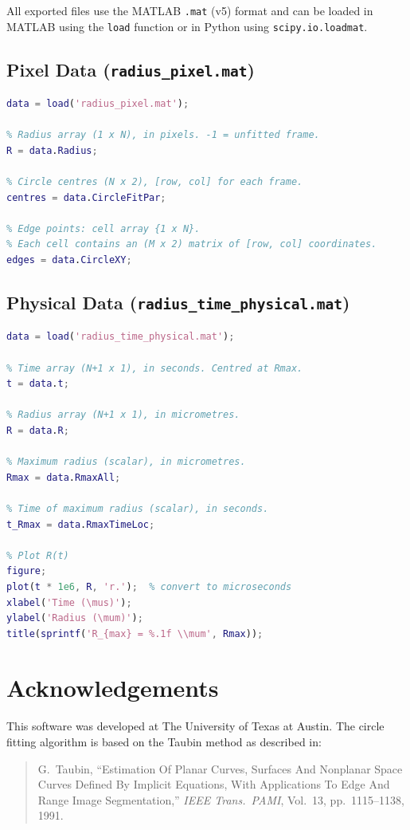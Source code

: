 \documentclass[11pt, letterpaper]{article}
\begin{document}
All exported files use the MATLAB \texttt{.mat} (v5) format and can be loaded
in MATLAB using the \texttt{load} function or in Python using
\texttt{scipy.io.loadmat}.

\subsection{Pixel Data (\texttt{radius\_pixel.mat})}

\begin{lstlisting}[language=Matlab]
data = load('radius_pixel.mat');

% Radius array (1 x N), in pixels. -1 = unfitted frame.
R = data.Radius;

% Circle centres (N x 2), [row, col] for each frame.
centres = data.CircleFitPar;

% Edge points: cell array {1 x N}.
% Each cell contains an (M x 2) matrix of [row, col] coordinates.
edges = data.CircleXY;
\end{lstlisting}

\subsection{Physical Data (\texttt{radius\_time\_physical.mat})}

\begin{lstlisting}[language=Matlab]
data = load('radius_time_physical.mat');

% Time array (N+1 x 1), in seconds. Centred at Rmax.
t = data.t;

% Radius array (N+1 x 1), in micrometres.
R = data.R;

% Maximum radius (scalar), in micrometres.
Rmax = data.RmaxAll;

% Time of maximum radius (scalar), in seconds.
t_Rmax = data.RmaxTimeLoc;

% Plot R(t)
figure;
plot(t * 1e6, R, 'r.');  % convert to microseconds
xlabel('Time (\mus)');
ylabel('Radius (\mum)');
title(sprintf('R_{max} = %.1f \\mum', Rmax));
\end{lstlisting}


\section*{Acknowledgements}

This software was developed at The University of Texas at Austin. The circle
fitting algorithm is based on the Taubin method as described in:

\begin{quote}
    G.\ Taubin, ``Estimation Of Planar Curves, Surfaces And Nonplanar Space
    Curves Defined By Implicit Equations, With Applications To Edge And Range
    Image Segmentation,'' \emph{IEEE Trans.\ PAMI}, Vol.~13, pp.~1115--1138,
    1991.
\end{quote}

\end{document}
